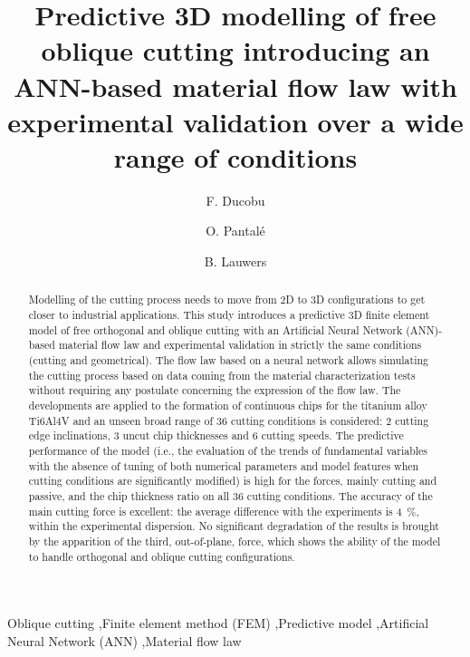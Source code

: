 \documentclass[preprint,12pt,times]{elsarticle}
\begin{document}
\begin{frontmatter}

\title{Predictive 3D modelling of free oblique cutting introducing an ANN-based material flow law with experimental validation over a wide range of conditions}

\author[1]{F. Ducobu}

\author[2]{O. Pantal\'{e}}
\author[3]{B. Lauwers}

\address[1]{Machine Design and Production Engineering Lab, Research Institute for Science and Material Engineering, UMONS, Belgium}
\address[2]{Laboratoire G\'{e}nie de Production, INP/ENIT, Universit\'{e} de Toulouse, Tarbes, France}
\address[3]{Department of Mechanical Engineering, KU Leuven \& Flanders Make@KU Leuven-MaPS, Belgium}

\begin{abstract}

Modelling of the cutting process needs to move from 2D to 3D configurations to get closer to industrial applications. This study introduces a predictive 3D finite element model of free orthogonal and oblique cutting with an Artificial Neural Network (ANN)-based material flow law and experimental validation in strictly the same conditions (cutting and geometrical). The flow law based on a neural network allows simulating the cutting process based on data coming from the material characterization tests without requiring any postulate concerning the expression of the flow law. The developments are applied to the formation of continuous chips for the titanium alloy Ti6Al4V and an unseen broad range of 36 cutting conditions is considered: 2 cutting edge inclinations, 3 uncut chip thicknesses and 6 cutting speeds. The predictive performance of the model (i.e., the evaluation of the trends of fundamental variables with the absence of tuning of both numerical parameters and model features when cutting conditions are significantly modified) is high for the forces, mainly cutting and passive, and the chip thickness ratio on all 36 cutting conditions. The accuracy of the main cutting force is excellent: the average difference with the experiments is \qty{4}{\%}, within the experimental dispersion. No significant degradation of the results is brought by the apparition of the third, out-of-plane, force, which shows the ability of the model to handle orthogonal and oblique cutting configurations.

\end{abstract}

\begin{keyword}

Oblique cutting \sep Finite element method (FEM) \sep Predictive model \sep Artificial Neural Network (ANN) \sep Material flow law

\end{keyword}

\end{frontmatter}
\end{document}

